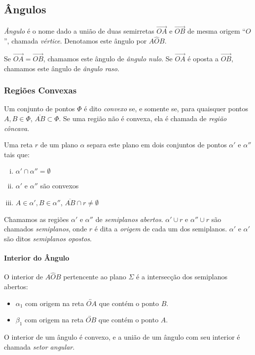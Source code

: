 \subsection{Ângulos}
\begin{df}
\emph{Ângulo} é o nome dado a união de duas semirretas $\overrightarrow{OA}$ e $\overrightarrow{OB}$ de mesma origem ``$O$'', chamada \emph{vértice}. Denotamos este ângulo por $A\hat{O}B$.
\end{df}
Se $\overrightarrow{OA}=\overrightarrow{OB}$, chamamos este ângulo de \emph{ângulo nulo}. Se $\overrightarrow{OA}$ é oposta a $\overrightarrow{OB}$, chamamos este ângulo de \emph{ângulo raso}.
\subsubsection{Regiões Convexas}
\begin{df}
Um conjunto de pontos $\Phi$ é dito \emph{convexo} se, e somente se, para quaisquer pontos $A,B \in \Phi$, $\overline{AB} \subset \Phi$.
Se uma região não é convexa, ela é chamada de \emph{região côncava}.
\end{df}
\begin{post}
Uma reta $r$ de um plano $\alpha$ separa este plano em dois conjuntos de pontos $\alpha'$ e $\alpha''$ tais que:
\begin{enumerate}[i)]
\item $\alpha' \cap \alpha'' = \emptyset$
\item $\alpha'$ e $\alpha''$ são convexos
\item $A \in \alpha', B \in \alpha''$,  $\overline{AB} \cap r \neq \emptyset $
\end{enumerate}
\end{post}
\begin{df}
Chamamos as regiões $\alpha'$ e $\alpha''$ de \emph{semiplanos abertos}. $\alpha' \cup r$ e $\alpha'' \cup r$ são chamados \emph{semiplanos}, onde $r$ é dita a \emph{origem} de cada um dos semiplanos. $\alpha'$ e $\alpha'$ são ditos \emph{semiplanos opostos}.
\end{df}
\paragraph{Interior do Ângulo} O interior de $A\hat{O}B$ pertencente ao plano $\Sigma$ é a intersecção dos semiplanos abertos:
\begin{itemize}
\item $\alpha_1$ com origem na reta $\overleftrightarrow{OA}$ que contém o ponto $B$. 
\item $\beta_1$ com origem na reta $\overleftrightarrow{OB}$ que contém o ponto $A$.
\end{itemize}
O interior de um ângulo é convexo, e a união de um ângulo com seu interior é chamada \emph{setor angular}.
